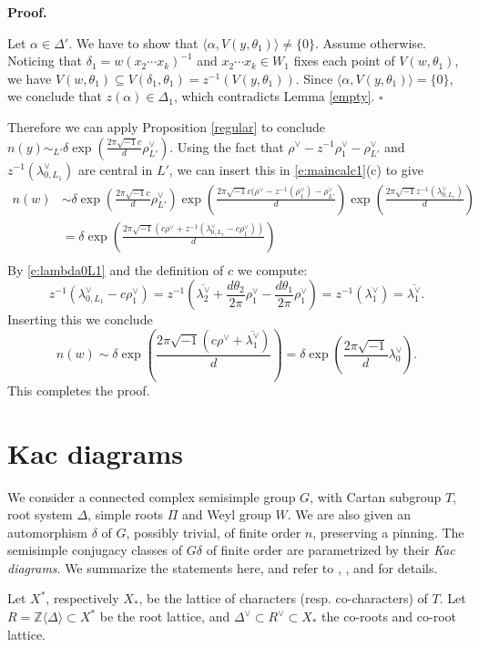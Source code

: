 \documentclass[10pt,leqno]{article}
\newcommand{\qed}{\hfill $\square$ \medskip}
\newenvironment{proof}[1][Proof]{\noindent\textbf{#1.} }{\qed}
\newcommand{\Z}{\mathbb Z}
\renewcommand{\a}{\mathfrak a}
\newcommand{\ch}[1]{#1^\vee}
\renewcommand{\sec}[1]{\section{#1}
\renewcommand{\theequation}{\thesection.\arabic{equation}}
  \setcounter{equation}{0}}
\newcommand\inv{^{-1}}
\def\a{\alpha}
\def\d{\delta}
\def\th{\theta}
\def\i{^{-1}}
\renewcommand{\sec}[1]{\section{#1}
\renewcommand{\theequation}{\thesection.\arabic{equation}}
  \setcounter{equation}{0}}
\begin{document}
\begin{proof}

Let $\a \in \Delta'$. We have to show that
$\langle\a, V(y, \th_1)\rangle \neq \{0\}$. 
Assume otherwise. Noticing that
$\d_1=w (x_2 \cdots x_k) \i$ and $x_2 \cdots x_k \in W_1$ fixes each
point of $V(w, \th_1)$, we have
$V(w, \th_1) \subseteq V(\d_1, \th_1)=z^{-1}(V(y, \th_1))$. Since $\langle\alpha,V(y,\theta_1)\rangle=\{0\}$, we conclude that
$z(\a) \in \Delta_1$, which contradicts Lemma \ref{empty}.
\end{proof}


Therefore we can apply Proposition \ref{regular} to conclude
$n(y)\sim_{L'}\delta\exp(\frac{2\pi \sqrt{-1}c}d\ch\rho_{L'})$.
Using the fact that $\ch\rho-z\inv\ch\rho_1-\ch\rho_{L'}$ and $z\inv(\ch\lambda_{0,L_1})$ are central in $L'$, we can insert
this in \eqref{e:maincalc1}(c)  to give
$$
\begin{aligned}
n(w)&\sim \delta\exp(\frac{2\pi \sqrt{-1}c}d\ch\rho_{L'})
  \exp(\frac{2\pi \sqrt{-1}c(\ch\rho-z\inv(\ch\rho_1)-\ch\rho_{L'}}d)
  \exp(\frac{2 \pi \sqrt{-1}z\inv( \ch\lambda_{0,L_1})}{d})\\
  &=\delta\exp(\frac{2\pi \sqrt{-1}(c\ch\rho+z\inv(\ch\lambda_{0,L_1}-c\ch\rho_1))}d)\\
\end{aligned}
$$
By \eqref{e:lambda0L1} and the definition of $c$ we compute:
$$
z\inv(\ch\lambda_{0,L_1}-c\ch\rho_1)=z\inv(\overline{\ch\lambda_2}+\frac{d\theta_2}{2\pi}\ch\rho_1-\frac{d\theta_1}{2\pi}\ch\rho_1)
=z\inv(\ch\lambda_1)=\overline{\ch\lambda_1}.
$$
Inserting this we conclude
$$
n(w)\sim\delta\exp(\frac{2\pi \sqrt{-1}(c\ch\rho+\overline{\ch\lambda_1})}d)=
\delta\exp(\frac{2\pi \sqrt{-1}}d\ch\lambda_0).
$$
This completes the proof.


\sec{Kac diagrams}
\label{s:kac}

We consider a connected complex semisimple group $G$, with Cartan subgroup $T$, root system $\Delta$,
simple roots $\Pi$ and Weyl group $W$. We are also given
an  automorphism $\delta$ of $G$, possibly trivial, of finite order $n$, preserving a pinning.
The semisimple
conjugacy classes of $G\delta$ of finite order are parametrized by their
{\it Kac diagrams}. We summarize the statements here, and refer to \cite{DM}, \cite{kac_book}, 
\cite{ov} and \cite{reeder_torsion} for details.


Let $X^*$, respectively $X_*$, be the lattice of characters (resp. co-characters) of $T$.
Let $R=\Z\langle\Delta\rangle\subset X^*$ be
the root lattice, and $\ch\Delta\subset \ch R\subset X_*$ the co-roots and co-root lattice.
\end{document}
